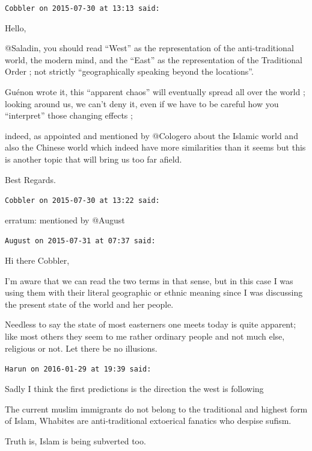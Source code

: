 \begin{footnotesize}
\begin{sffamily}
\hfill

\texttt{Cobbler on 2015-07-30 at 13:13 said:}

Hello,

@Saladin, you should read ``West'' as the representation of the anti-traditional world, the modern mind, and the ``East'' as the representation of the Traditional Order ; not strictly ``geographically speaking beyond the locations''.

Guénon wrote it, this ``apparent chaos'' will eventually spread all over the world ; looking around us, we can't deny it, even if we have to be careful how you ``interpret'' those changing effects ;

indeed, as appointed and mentioned by @Cologero about the Islamic world and also the Chinese world which indeed have more similarities than it seems but this is another topic that will bring us too far afield.

Best Regards.

\hfill

\texttt{Cobbler on 2015-07-30 at 13:22 said:}

erratum: mentioned by @August

\hfill

\texttt{August on 2015-07-31 at 07:37 said:}

Hi there Cobbler,

I'm aware that we can read the two terms in that sense, but in this case I was using them with their literal geographic or ethnic meaning since I was discussing the present state of the world and her people.

Needless to say the state of most easterners one meets today is quite apparent; like most others they seem to me rather ordinary people and not much else, religious or not. Let there be no illusions.

\hfill

\texttt{Harun on 2016-01-29 at 19:39 said:}

Sadly I think the first predictions is the direction the west is following

The current muslim immigrants do not belong to the traditional and highest form of Islam, Whabites are anti-traditional extoerical fanatics who despise sufism.

Truth is, Islam is being subverted too.

\hfill

\end{sffamily}
\end{footnotesize}

